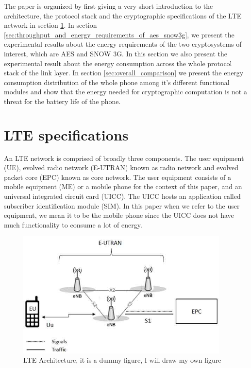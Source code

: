 \documentclass[lnicst,sechang,a4paper]{svmultln}
\begin{document}
The paper is organized by first giving a very short introduction to the architecture, the protocol stack and the cryptographic specifications of the LTE network in section \ref{sec:lte_specifications}. In section \ref{sec:throughput_and_energy_requirements_of_aes_snow3g}, we present the experimental results about the energy requirements of the two cryptosystems of interest, which are AES and SNOW 3G. In this section we also present the experimental result about the energy consumption across the whole protocol stack of the link layer. In section \ref{sec:overall_comparison} we present the energy consumption distribution of the whole phone among it's different functional modules and show that the energy needed for cryptographic computation is not a threat for the battery life of the phone. 

\section{LTE specifications}
\label{sec:lte_specifications}
An LTE network is comprised of broadly three components. The user equipment (UE), evolved radio network (E-UTRAN) known as radio network and evolved packet core (EPC) known as core network. The user equipment consists of a mobile equipment (ME) or a mobile phone for the context of this paper, and an universal integrated circuit card (UICC). The UICC hosts an application called subscriber identification module (SIM). In this paper when we refer to the user equipment, we mean it to be the mobile phone since the UICC does not have much functionality to consume a lot of energy.

\begin{figure}
  \includegraphics[width=0.95\textwidth]{lte_architecture.jpg}
\caption{LTE Architecture, it is a dummy figure, I will draw my own figure}
\label{fig:protocl_stack}       %
\end{figure}
\end{document}
